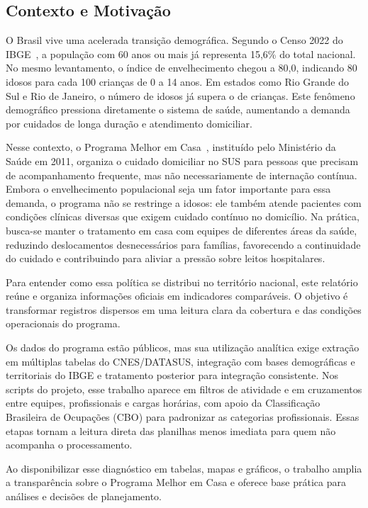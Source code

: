 \documentclass[12pt]{article}
\DeclareRobustCommand{\citelink}[2]{#2~\cite{#1}}
\begin{document}
\subsection{Contexto e Motivação}

O Brasil vive uma acelerada transição demográfica. Segundo o \citelink{ibge2022}{Censo 2022 do IBGE}, a população com 60 anos ou mais já representa 15,6\% do total nacional. No mesmo levantamento, o índice de envelhecimento chegou a 80,0, indicando 80 idosos para cada 100 crianças de 0 a 14 anos. Em estados como Rio Grande do Sul e Rio de Janeiro, o número de idosos já supera o de crianças. Este fenômeno demográfico pressiona diretamente o sistema de saúde, aumentando a demanda por cuidados de longa duração e atendimento domiciliar.

Nesse contexto, o \citelink{portaria825}{Programa Melhor em Casa}, instituído pelo Ministério da Saúde em 2011, organiza o cuidado domiciliar no SUS para pessoas que precisam de acompanhamento frequente, mas não necessariamente de internação contínua. Embora o envelhecimento populacional seja um fator importante para essa demanda, o programa não se restringe a idosos: ele também atende pacientes com condições clínicas diversas que exigem cuidado contínuo no domicílio. Na prática, busca-se manter o tratamento em casa com equipes de diferentes áreas da saúde, reduzindo deslocamentos desnecessários para famílias, favorecendo a continuidade do cuidado e contribuindo para aliviar a pressão sobre leitos hospitalares.

Para entender como essa política se distribui no território nacional, este relatório reúne e organiza informações oficiais em indicadores comparáveis. O objetivo é transformar registros dispersos em uma leitura clara da cobertura e das condições operacionais do programa.

Os dados do programa estão públicos, mas sua utilização analítica exige extração em múltiplas tabelas do CNES/DATASUS, integração com bases demográficas e territoriais do IBGE e tratamento posterior para integração consistente. Nos scripts do projeto, esse trabalho aparece em filtros de atividade e em cruzamentos entre equipes, profissionais e cargas horárias, com apoio da Classificação Brasileira de Ocupações (CBO) para padronizar as categorias profissionais. Essas etapas tornam a leitura direta das planilhas menos imediata para quem não acompanha o processamento.

Ao disponibilizar esse diagnóstico em tabelas, mapas e gráficos, o trabalho amplia a transparência sobre o Programa Melhor em Casa e oferece base prática para análises e decisões de planejamento.
\end{document}
